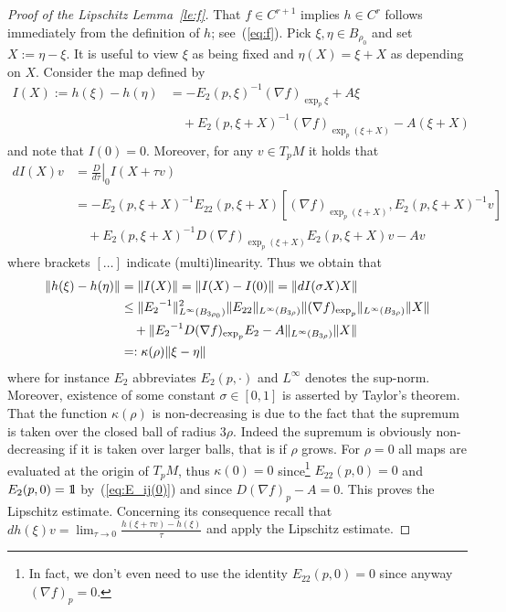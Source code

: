 \documentclass{article}
\begin{document}
\begin{proof}[Proof of the Lipschitz Lemma~\ref{le:f}]
That $f\in C^{r+1}$ implies $h\in C^r$ follows immediately from the
definition of $h$; see~(\ref{eq:f}).
%
Pick $\xi,\eta\in B_{\rho_0}$ and set $X:=\eta-\xi$.
It is useful to view $\xi$ as being fixed and 
$\eta(X)=\xi+X$ as depending on $X$.
Consider the map defined by
\begin{equation*}
\begin{split}
     I(X)
    :=h(\xi)-h(\eta)
   &=-E_2(p,\xi)^{-1}(\nabla f)_{\exp_p\xi}+A\xi\\
   &\quad
     +E_2(p,\xi+X)^{-1}(\nabla f)_{\exp_p(\xi+X)}-A(\xi+X)
\end{split}
\end{equation*}
and note that $I(0)=0$. Moreover, for any
$v\in T_pM$ it holds that
\begin{equation*}
\begin{split}
     dI(X)v
   &=\left.\tfrac{D}{d\tau}\right|_0 I(X+\tau v)\\
   &=-E_2(p,\xi+X)^{-1}E_{22}(p,\xi+X)
     \left[(\nabla f)_{\exp_p(\xi+X)},E_2(p,\xi+X)^{-1}v\right]
     \\
   &\quad
     +E_2(p,\xi+X)^{-1} D(\nabla f)_{\exp_p(\xi+X)}
     E_2(p,\xi+X) v -Av 
\end{split}
\end{equation*}
where brackets $[\dots]$ indicate (multi)linearity.
Thus we obtain that
\begin{equation*}
\begin{split}
     \mathopen\|h(\xi)-h(\eta)\mathclose\|
   &=\mathopen\|I(X)\mathclose\|
     =\mathopen\|I(X)-I(0)\mathclose\|
     =\mathopen\|dI(\sigma X)X\mathclose\|\\
   &\le
     \mathopen\|{E_2}^{-1}\mathclose\|_{L^\infty(B_{3\rho_0})}^2
     \mathopen\|E_{22}\mathclose\|_{L^\infty(B_{3\rho})}
     \mathopen\|(\nabla f)_{\exp_p}\mathclose\|_{L^\infty(B_{3\rho})}
     \mathopen\|X\mathclose\|\\
   &\quad
     +\mathopen\|{E_2}^{-1} D(\nabla f)_{\exp_p}
     E_2-A\mathclose\|_{L^\infty(B_{3\rho})}\mathopen\|X\mathclose\|\\
   &=:\kappa(\rho) \mathopen\|\xi-\eta\mathclose\|
\end{split}
\end{equation*}
where for instance $E_2$ abbreviates $E_2(p,\cdot)$
and $L^\infty$ denotes the sup-norm.
Moreover, existence of some constant
$\sigma\in[0,1]$ is asserted by Taylor's theorem.
That the function $\kappa(\rho)$ is non-decreasing
is due to the fact that the supremum is taken over
the closed ball of radius $3\rho$. Indeed the
supremum is obviously non-decreasing if it is taken
over larger balls, that is if $\rho$ grows.
For $\rho=0$ all maps are evaluated at the origin
of $T_pM$, thus $\kappa(0)=0$ since\footnote{
  In fact, we don't even need to use the identity
  $E_{22}(p,0)=0$ since anyway $(\nabla f)_p=0$.
  }
$E_{22}(p,0)=0$ and $E_2(p,0)=\1$
by~(\ref{eq:E_ij(0)}) and since $D(\nabla f)_p-A=0$.
This proves the Lipschitz estimate. Concerning its consequence recall that
$dh(\xi)v=\lim_{\tau\to  0}\frac{h(\xi+\tau v)-h(\xi)}{\tau}$
and apply the Lipschitz estimate.


\end{proof}
\end{document}
